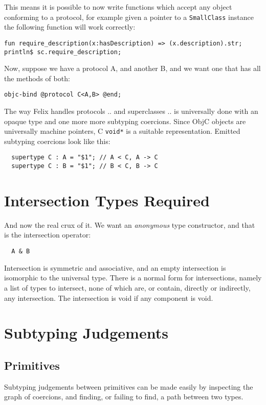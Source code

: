 \documentclass[oneside]{book}
\begin{document}
This means it is possible to now write functions which accept any object
conforming to a protocol, for example given a pointer to a {\tt SmallClass} instance
the following function will work correctly:

\begin{verbatim}
fun require_description(x:hasDescription) => (x.description).str;
println$ sc.require_description;
\end{verbatim}

Now, suppose we have a protocol A, and another B, and we want one
that has all the methods of both:

\begin{verbatim}
objc-bind @protocol C<A,B> @end;
\end{verbatim}

The way Felix handles protocols .. and superclasses .. is universally done
with an opaque type and one more more subtyping coercions. Since ObjC
objects are universally machine pointers, C \verb+void*+ is a suitable
representation. Emitted subtyping coercions look like this:

\begin{verbatim}
  supertype C : A = "$1"; // A < C, A -> C
  supertype C : B = "$1"; // B < C, B -> C
\end{verbatim}

\section{Intersection Types Required}
And now the real crux of it. We want an {\em anonymous} type constructor,
and that is the intersection operator:

\begin{verbatim}
  A & B
\end{verbatim}

Intersection is symmetric and associative, and an empty intersection is
isomorphic to the universal type.  There is a normal form for intersections,
namely a list of types to intersect, none of which are, or contain, directly
or indirectly, any intersection. The intersection is void if any component
is void. 

\section{Subtyping Judgements}
\subsection{Primitives}
Subtyping judgements between primitives 
can be made easily by inspecting the graph of coercions, and finding, or failing to find, 
a path between two types. 
\end{document}
